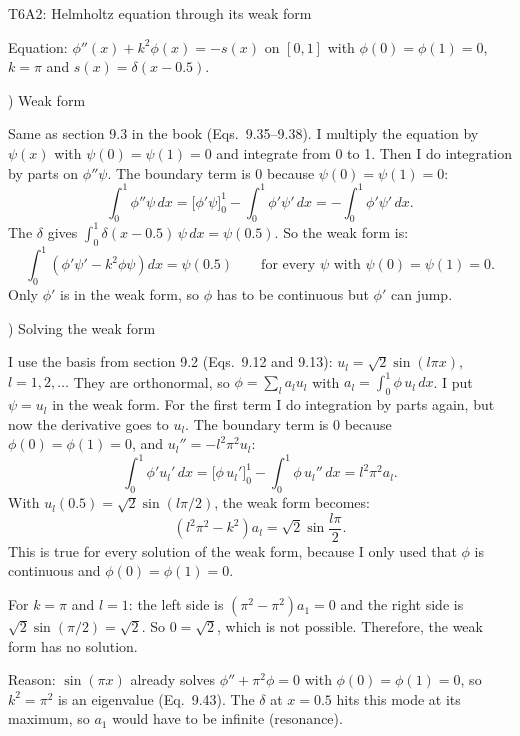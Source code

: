 \documentclass[11pt]{article}
\begin{document}
\begin{center}
{\Large T6A2: Helmholtz equation through its weak form}
\end{center}

Equation: $\phi''(x) + k^2\phi(x) = -s(x)$ on $[0, 1]$ with $\phi(0) = \phi(1) = 0$, $k = \pi$ and $s(x) = \delta(x - 0.5)$.

\medskip
{}) Weak form
\nopagebreak

\noindent Same as section 9.3 in the book (Eqs.\ 9.35--9.38). I multiply the equation by $\psi(x)$ with $\psi(0) = \psi(1) = 0$ and integrate from 0 to 1.
Then I do integration by parts on $\phi''\psi$. The boundary term is 0 because $\psi(0) = \psi(1) = 0$:
\[
\int_0^1 \phi''\psi\,dx = \Big[\phi'\psi\Big]_0^1 - \int_0^1 \phi'\psi'\,dx = -\int_0^1 \phi'\psi'\,dx.
\]
The $\delta$ gives $\int_0^1 \delta(x - 0.5)\,\psi\,dx = \psi(0.5)$. So the weak form is:
\[
\int_0^1 \left(\phi'\psi' - k^2\phi\psi\right) dx = \psi(0.5) \qquad \text{for every } \psi \text{ with } \psi(0) = \psi(1) = 0.
\]
Only $\phi'$ is in the weak form, so $\phi$ has to be continuous but $\phi'$ can jump.

\medskip
{}) Solving the weak form
\nopagebreak

\noindent I use the basis from section 9.2 (Eqs.\ 9.12 and 9.13): $u_l = \sqrt{2}\sin(l\pi x)$, $l = 1, 2, \dots$
They are orthonormal, so $\phi = \sum_l a_l u_l$ with $a_l = \int_0^1 \phi\,u_l\,dx$.
I put $\psi = u_l$ in the weak form. For the first term I do integration by parts again, but now the derivative goes to $u_l$.
The boundary term is 0 because $\phi(0) = \phi(1) = 0$, and $u_l'' = -l^2\pi^2 u_l$:
\[
\int_0^1 \phi' u_l'\,dx = \Big[\phi\,u_l'\Big]_0^1 - \int_0^1 \phi\,u_l''\,dx = l^2\pi^2 a_l.
\]
With $u_l(0.5) = \sqrt{2}\sin(l\pi/2)$, the weak form becomes:
\[
\left(l^2\pi^2 - k^2\right) a_l = \sqrt{2}\sin\frac{l\pi}{2}.
\]
This is true for every solution of the weak form, because I only used that $\phi$ is continuous and $\phi(0) = \phi(1) = 0$.

For $k = \pi$ and $l = 1$: the left side is $(\pi^2 - \pi^2)a_1 = 0$ and the right side is $\sqrt{2}\sin(\pi/2) = \sqrt{2}$.
So $0 = \sqrt{2}$, which is not possible. Therefore, the weak form has no solution.

Reason: $\sin(\pi x)$ already solves $\phi'' + \pi^2\phi = 0$ with $\phi(0) = \phi(1) = 0$, so $k^2 = \pi^2$ is an eigenvalue (Eq.\ 9.43).
The $\delta$ at $x = 0.5$ hits this mode at its maximum, so $a_1$ would have to be infinite (resonance).
\end{document}
